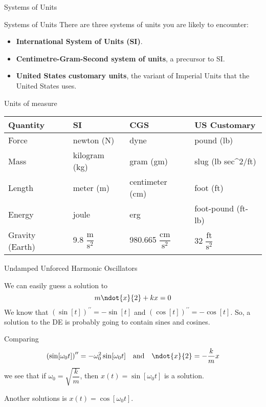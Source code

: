\documentclass{beamer}
\begin{document}
\begin{frame}{Systems of Units}
\begin{block}{Systems of Units}
There are three systems of units you are likely to encounter:
\onslide<+->
\begin{itemize}[<+- | alert@+>]
\item \textbf{International System of Units (SI)}.
\item \textbf{Centimetre-Gram-Second system of units}, a precursor to SI\@.
\item \textbf{United States customary units}, the variant of Imperial Units that the United States uses.
\end{itemize}
\end{block}
\onslide<+->
\begin{block}{Units of measure}
\begin{tabular}{llll}
\textbf{Quantity} & \textbf{SI} & \textbf{CGS} & \textbf{US Customary} \\
\hline
Force & newton (N) & dyne & pound (lb) \\
\onslide<+->
Mass & kilogram (kg) & gram (gm) & slug (lb sec\textasciicircum2/ft) \\
\onslide<+->
Length & meter (m) & centimeter (cm) & foot (ft) \\
\onslide<+->
Energy & joule & erg & foot-pound (ft-lb) \\
\onslide<+->
Gravity (Earth) & 9.8 $\dfrac{\text{m}}{{\text{s}}^2}$ & 980.665 $\dfrac{\text{cm}}{{\text{s}}^2}$ & 32 $\dfrac{\text{ft}}{{\text{s}}^2}$
\end{tabular}
\end{block}
\end{frame}

\begin{frame}{Undamped Unforced Harmonic Oscillators}
\begin{block}{}
We can easily guess a solution to
\begin{equation*}
m\ndot{x}{2}+kx=0
\end{equation*}\pause
We know that ${\left(\sin[t]\right)}^{\prime\prime}=-\sin[t]$ and ${\left(\cos[t]\right)}^{\prime\prime}=-\cos[t]$. So, a solution to the DE is probably going to contain sines and cosines.\pause

Comparing
\begin{equation*}
{\left(\sin[\omega_0 t]\right)}^{\prime\prime}=-\omega_0^2\sin[\omega_0 t]
\quad\text{and}\quad
\ndot{x}{2}=-\dfrac{k}{m}x
\end{equation*}
we see that if $\omega_0=\sqrt{\dfrac{k}{m}}$, then $x(t)=\sin[\omega_0 t]$ is a solution.
\end{block}\pause
\begin{block}{}
Another solutions is $x(t)=\cos[\omega_0 t]$.
\end{block}
\end{frame}
\end{document}
